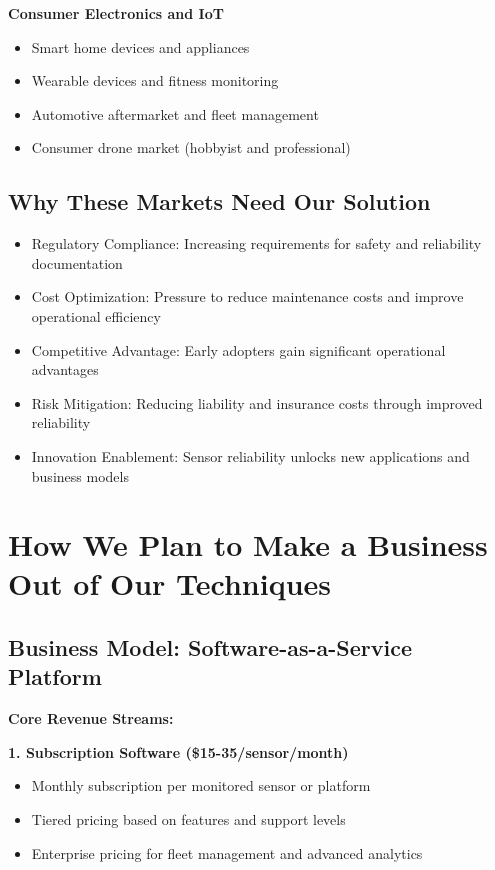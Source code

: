 \documentclass[11pt,letterpaper]{article}
\begin{document}
\textbf{Consumer Electronics and IoT}
\begin{itemize}[leftmargin=10pt, itemsep=1pt]
    \item Smart home devices and appliances
    \item Wearable devices and fitness monitoring
    \item Automotive aftermarket and fleet management
    \item Consumer drone market (hobbyist and professional)
\end{itemize}

\subsection*{Why These Markets Need Our Solution}

\begin{itemize}[leftmargin=10pt, itemsep=1pt]
    \item Regulatory Compliance: Increasing requirements for safety and reliability documentation
    \item Cost Optimization: Pressure to reduce maintenance costs and improve operational efficiency
    \item Competitive Advantage: Early adopters gain significant operational advantages
    \item Risk Mitigation: Reducing liability and insurance costs through improved reliability
    \item Innovation Enablement: Sensor reliability unlocks new applications and business models
\end{itemize}

\section*{How We Plan to Make a Business Out of Our Techniques}

\subsection*{Business Model: Software-as-a-Service Platform}

\textbf{Core Revenue Streams:}

\textbf{1. Subscription Software (\$15-35/sensor/month)}
\begin{itemize}[leftmargin=10pt, itemsep=1pt]
    \item Monthly subscription per monitored sensor or platform
    \item Tiered pricing based on features and support levels
    \item Enterprise pricing for fleet management and advanced analytics
\end{itemize}
\end{document}
